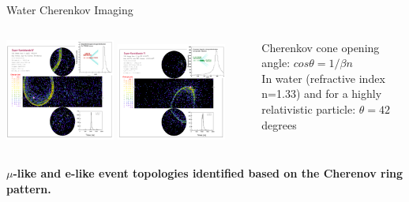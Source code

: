 %
%
%

\begin{frame}{Water Cherenkov Imaging}

\begin{columns}
  \begin{column}{0.70\textwidth}
    \begin{center}
    \includegraphics[width=0.45\textwidth,height=0.40\textheight]{./images/3nu/atmo/superk_1Rmu.png}
    \includegraphics[width=0.45\textwidth,height=0.40\textheight]{./images/3nu/atmo/superk_1Re.png}\\
   \end{center}
  \end{column}
  \begin{column}{0.30\textwidth}
    \centering
    {\scriptsize
      Cherenkov cone opening angle: {\color{red}$cos\theta=1/{\beta}n$}\\
      \vspace{0.2cm}
      In water (refractive index n=1.33) and for
      a highly relativistic particle: {\color{red} $\theta=42$ degrees}\\
    }
  \end{column}
\end{columns}
\begin{columns}
  \begin{column}{0.65\textwidth}
    \centering
    \vspace{0.3cm}
    {\bf $\mu$-like and e-like event topologies identified based on the Cherenov ring pattern.}\\

\end{column}
\end{columns}
\end{frame}
